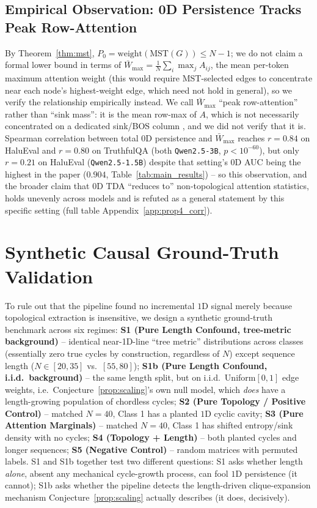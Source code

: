 \documentclass{article}
\begin{document}
\subsection{Empirical Observation: 0D Persistence Tracks Peak Row-Attention}
By Theorem~\ref{thm:mst}, $P_0 = \text{weight}(\text{MST}(G)) \le N-1$; we do not claim a formal lower bound in terms of $\bar{W}_{\max} = \frac{1}{N}\sum_i \max_j A_{ij}$, the mean per-token maximum attention weight (this would require MST-selected edges to concentrate near each node's highest-weight edge, which need not hold in general), so we verify the relationship empirically instead. We call $\bar{W}_{\max}$ ``peak row-attention'' rather than ``sink mass'': it is the mean row-max of $A$, which is not necessarily concentrated on a dedicated sink/BOS column \citep{xiao2023efficient}, and we did not verify that it is. Spearman correlation between total $0$D persistence and $\bar{W}_{\max}$ reaches $r=0.84$ on HaluEval and $r=0.80$ on TruthfulQA (both \texttt{Qwen2.5-3B}, $p<10^{-60}$), but only $r=0.21$ on HaluEval (\texttt{Qwen2.5-1.5B}) despite that setting's $0$D AUC being the highest in the paper ($0.904$, Table~\ref{tab:main_results}) -- so this observation, and the broader claim that $0$D TDA ``reduces to'' non-topological attention statistics, holds unevenly across models and is refuted as a general statement by this specific setting (full table Appendix~\ref{app:prop4_corr}).

\section{Synthetic Causal Ground-Truth Validation}
\label{sec:synthetic}
To rule out that the pipeline found no incremental $1$D signal merely because topological extraction is insensitive, we design a synthetic ground-truth benchmark across six regimes: \textbf{S1 (Pure Length Confound, tree-metric background)} -- identical near-1D-line ``tree metric'' distributions across classes (essentially zero true cycles by construction, regardless of $N$) except sequence length ($N\in[20,35]$ vs.\ $[55,80]$); \textbf{S1b (Pure Length Confound, i.i.d.\ background)} -- the same length split, but on i.i.d.\ Uniform$[0,1]$ edge weights, i.e.\ Conjecture~\ref{prop:scaling}'s own null model, which \emph{does} have a length-growing population of chordless cycles; \textbf{S2 (Pure Topology / Positive Control)} -- matched $N{=}40$, Class 1 has a planted $1$D cyclic cavity; \textbf{S3 (Pure Attention Marginals)} -- matched $N{=}40$, Class 1 has shifted entropy/sink density with no cycles; \textbf{S4 (Topology + Length)} -- both planted cycles and longer sequences; \textbf{S5 (Negative Control)} -- random matrices with permuted labels. S1 and S1b together test two different questions: S1 asks whether length \emph{alone}, absent any mechanical cycle-growth process, can fool $1$D persistence (it cannot); S1b asks whether the pipeline detects the length-driven clique-expansion mechanism Conjecture~\ref{prop:scaling} actually describes (it does, decisively).
\end{document}
